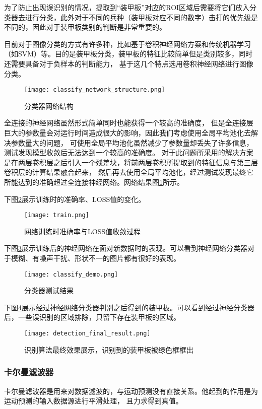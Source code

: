 为了防止出现误识别的情况，提取到“装甲板”对应的ROI区域后需要将它们放入分类器去进行分类，此外对于不同的兵种（装甲板对应不同的数字）击打的优先级是不同的，因此对于装甲板类别的判断是非常重要的。\par
目前对于图像分类的方式有许多种，比如基于卷积神经网络方案和传统机器学习（如SVM）等。目的是装甲板分类，装甲板的特征比较简单但是类别较多，同时还需要具备对于负样本的判断能力，
基于这几个特点选用卷积神经网络进行图像分类。
\begin{figure}[H]
    \centering
    \texttt{[image: classify\_network\_structure.png]} 
    \caption{分类器网络结构} 
    \label{分类器网络结构}
\end{figure}
全连接的神经网络虽然形式简单同时也能获得一个较高的准确度，
但是全连接层巨大的参数量会对运行时间造成很大的影响，因此我们考虑使用全局平均池化去解决参数量大的问题，
可使用全局平均池化虽然减少了参数量却丢失了许多信息，测试发现模型收敛后无法达到一个较高的准确度。
对于此问题所采用的解决方案是在两层卷积层之后引入一个残差块，将前两层卷积所提取到的特征信息与第三层卷积层的计算结果融合起来，
然后再去使用全局平均池化，经过测试发现最终它所能达到的准确超过全连接神经网络。网络结果图\ref{分类器网络结构}所示。


下图\ref{网络训练时准确率与LOSS值收敛过程}展示训练时的准确率、LOSS值的变化。
\begin{figure}[H]
    \centering
    \texttt{[image: train.png]} 
    \caption{网络训练时准确率与LOSS值收敛过程} 
    \label{网络训练时准确率与LOSS值收敛过程}
\end{figure}


下图\ref{分类器测试结果}展示训练后的神经网络在面对新数据时的表现。可以看到神经网络分类器对于模糊、有噪声干扰、形状不一的图片都有很好的表现。
\begin{figure}[H]
    \centering
    \texttt{[image: classify\_demo.png]} 
    \caption{分类器测试结果} 
    \label{分类器测试结果}
\end{figure}

下图\ref{识别算法最终效果展示}展示经过神经网络分类器判别之后得到的装甲板。可以看到经过神经分类器后，一些误识别的区域排除，只留下存在装甲板的区域。
\begin{figure}[H]
    \centering
    \texttt{[image: detection\_final\_result.png]} 
    \caption{识别算法最终效果展示，识别到的装甲板被绿色框框出} 
    \label{识别算法最终效果展示}
\end{figure}

\subsubsection{卡尔曼滤波器}
卡尔曼滤波器是用来对数据滤波的，与运动预测没有直接关系。他起到的作用是为运动预测的输入数据源进行平滑处理，
且力求得到真值。\par

